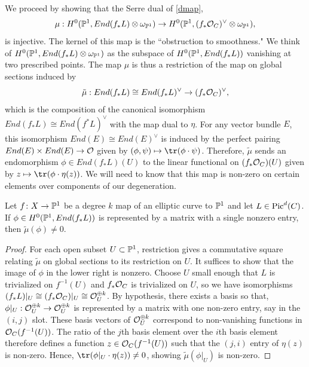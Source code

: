 We proceed by showing that the Serre dual of \eqref{dmap},
\begin{equation} \label{sd}\dcref{4.2}
\source{refined-brill-noether-theory-hurwitz-spaces}
\mu: H^0(\pp^1, End(f_*L) \otimes \omega_{\pp^1}) \rightarrow H^0(\pp^1, (f_*\O_C)^\vee \otimes \omega_{\pp^1}),
\end{equation}
is injective. The kernel of this map is the ``obstruction to smoothness." We think of $H^0(\mathbb{P}^1, End(f_*L) \otimes \omega_{\mathbb{P}^1})$ as the subspace of $H^0(\mathbb{P}^1, End(f_*L))$ vanishing at two prescribed points. The map $\mu$ is thus a restriction of the map on global sections induced by
\[\tilde{\mu}: End(f_*L) \cong End(f_*L)^\vee \to (f_* \mathcal{O}_C)^\vee,\]
which is the composition of the canonical isomorphism $End(f_*L) \cong End(f^*L)^\vee$ with the map dual to $\eta$. For any vector bundle $E$, this isomorphism
$End(E) \cong End(E)^\vee$
 is induced by the perfect pairing $End(E) \times End(E) \to \mathcal{O}$ given by $(\phi, \psi) \mapsto \tr(\phi \cdot \psi)$. Therefore, $\tilde{\mu}$ sends
an endomorphism $\phi \in End(f_*L)(U)$ to the linear functional on $(f_*\mathcal{O}_C)(U)$ given by $z \mapsto \tr(\phi  \cdot \eta(z))$. We will need to know that this map is non-zero on certain elements over components of our degeneration.

\begin{Lemma}
\notready \label{nz}
Let $f\colon  X \rightarrow \mathbb{P}^1$ be a degree $k$ map of an elliptic curve to $\mathbb{P}^1$ and let $L \in \operatorname{Pic}^d(C)$.
If $\phi \in H^0(\mathbb{P}^1, End(f_*L))$ is represented by a matrix with a single nonzero entry, then $\tilde{\mu}(\phi) \neq 0$.
\end{Lemma}
\begin{proof}
For each open subset $U \subset \mathbb{P}^1$, restriction gives a commutative
square relating $\tilde{\mu}$ on global sections to its restriction on $U$.
It suffices to show that the image of $\phi$ in the lower right is nonzero.
Choose $U$ small enough that $L$ is trivialized on $f^{-1}(U)$ and $f_*\mathcal{O}_C$ is trivialized on $U$, so
we have isomorphisms $(f_*L)|_U \cong (f_*\mathcal{O}_C)|_U \cong \mathcal{O}_{U}^{\oplus k}$. By hypothesis, there exists a basis so that, $\phi|_U : \mathcal{O}_U^{\oplus k} \rightarrow \mathcal{O}_U^{\oplus k}$ is represented by a matrix with one non-zero entry, say in the $(i, j)$ slot. These basis vectors of $\mathcal{O}_U^{\oplus k}$ correspond to non-vanishing functions in $\mathcal{O}_C(f^{-1}(U))$. The ratio of the $j$th basis element over the $i$th basis element therefore defines a function $z \in \mathcal{O}_C(f^{-1}(U))$ such that the $(j, i)$ entry of $\eta(z)$ is non-zero.
Hence, $\tr(\phi|_U \cdot \eta(z)) \neq 0$, showing $\tilde{\mu}(\phi|_U)$ is non-zero.
\end{proof}

